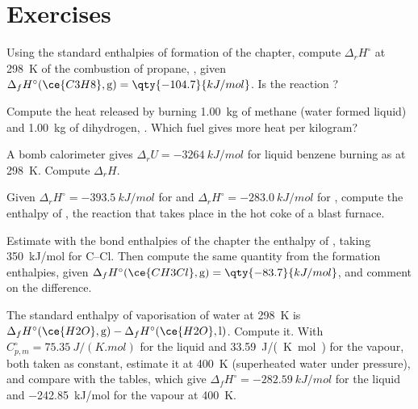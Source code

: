 \section{Exercises}

\begin{exercise}[$\star$]\label{exo:b2:reaction-enthalpy:1}
Using the standard enthalpies of formation of the chapter, compute
$\Delta_r H^\circ$ at \qty{298}{K} of the combustion of propane,
, given $\Delta_f
H^\circ(\ce{C3H8}, \text{g}) = \qty{-104.7}{kJ/mol}$. Is the reaction
?
\end{exercise}

\begin{exercise}[$\star$]\label{exo:b2:reaction-enthalpy:2}
Compute the heat released by burning \qty{1.00}{kg} of methane (water
formed liquid) and \qty{1.00}{kg} of dihydrogen, . Which fuel gives more heat per kilogram?
\end{exercise}

\begin{exercise}[$\star$]\label{exo:b2:reaction-enthalpy:3}
A bomb calorimeter gives $\Delta_r U = \qty{-3264}{kJ/mol}$ for liquid
benzene burning as  at
\qty{298}{K}. Compute $\Delta_r H$.
\end{exercise}

\begin{exercise}[$\star$]\label{exo:b2:reaction-enthalpy:4}
Given $\Delta_r H^\circ = \qty{-393.5}{kJ/mol}$ for  and $\Delta_r H^\circ = \qty{-283.0}{kJ/mol}$ for , compute the enthalpy of ,
the reaction that takes place in the hot coke of a blast furnace.
\end{exercise}

\begin{exercise}[$\star\star$]\label{exo:b2:reaction-enthalpy:5}
Estimate with the bond enthalpies of the chapter the enthalpy of
, taking \qty{350}{kJ/mol} for
C--Cl. Then compute the same quantity from the formation enthalpies,
given $\Delta_f H^\circ(\ce{CH3Cl}, \text{g}) = \qty{-83.7}{kJ/mol}$, and
comment on the difference.
\end{exercise}

\begin{exercise}[$\star\star$]\label{exo:b2:reaction-enthalpy:6}
The standard enthalpy of vaporisation of water at \qty{298}{K} is
$\Delta_f H^\circ(\ce{H2O}, \text{g}) - \Delta_f H^\circ(\ce{H2O},
\text{l})$. Compute it. With $C_{p,m}^\circ = \qty{75.35}{J/(K.mol)}$ for
the liquid and \qty{33.59}{J/(K.mol)} for the vapour, both taken as
constant, estimate it at \qty{400}{K} (superheated water under pressure),
and compare with the tables, which give $\Delta_f H^\circ =
\qty{-282.59}{kJ/mol}$ for the liquid and \qty{-242.85}{kJ/mol} for the
vapour at \qty{400}{K}.
\end{exercise}

